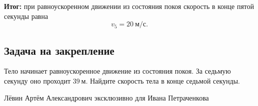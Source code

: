\documentclass[12pt,a4paper]{article}
\begin{document}
\textcolor{teal!60!black}{\textbf{Итог:}} при равноускоренном движении из состояния покоя скорость в конце пятой секунды равна
\[
\boxed{v_5=20\ \text{м/с}}.
\]

\subsection*{Задача на закрепление}
Тело начинает равноускоренное движение из состояния покоя. За седьмую секунду оно проходит $39\ \text{м}$. Найдите скорость тела в конце седьмой секунды.

\vfill
\begin{center}
\small Лёвин Артём Александрович эксклюзивно для Ивана Петраченкова
\end{center}
\end{document}
